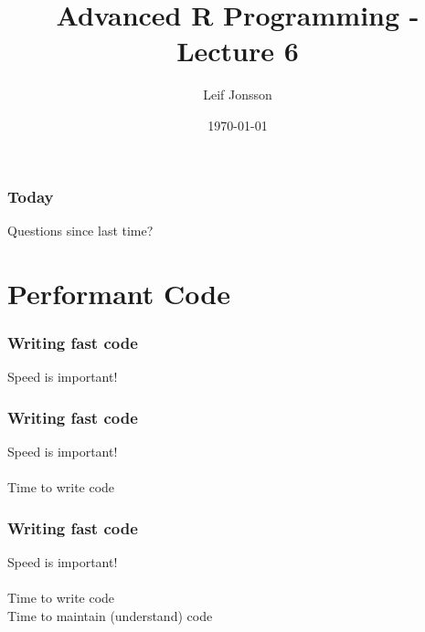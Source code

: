 \documentclass{beamer}
\title[Lecture 6]{Advanced R Programming - Lecture 6} %
\author{Leif Jonsson} %
\institute[STIMA LiU] %
{
Link\"{o}ping University \\ %
\medskip
\textit{leif.jonsson@ericsson.com\\leif.r.jonsson@liu.se} %
}
\date{\today} %
\begin{document}
\begin{frame}
\titlepage %
\end{frame}

\begin{frame}
\frametitle{Today} %
\tableofcontents %
\end{frame}


\begin{frame}
	\Huge{\centerline{Questions since last time?}}
\end{frame}

\section{Performant Code}

\begin{frame}
	\frametitle{Writing fast code}
	\begin{center}
	Speed is important!
	\end{center}
\end{frame}

\begin{frame}
	\frametitle{Writing fast code}
	\begin{center}
		Speed is important! \\~\\
		Time to write code
	\end{center}
\end{frame}

\begin{frame}
	\frametitle{Writing fast code}
	\begin{center}
		Speed is important! \\~\\
		Time to write code \\
		Time to maintain (understand) code
	\end{center}
\end{frame}
\end{document}
